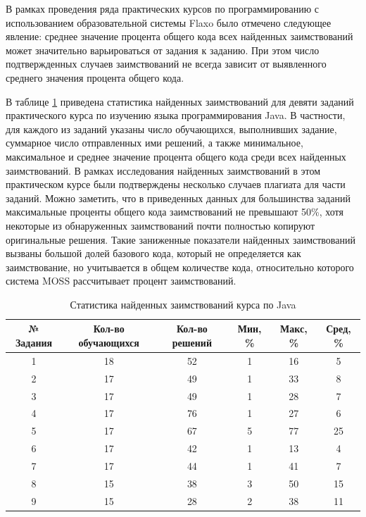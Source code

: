 \documentclass[a4paper,14pt]{extarticle}
\begin{document}
В рамках проведения ряда практических курсов по программированию с использованием образовательной системы Flaxo было отмечено следующее явление: среднее значение процента общего кода всех найденных заимствований может значительно варьироваться от задания к заданию. При этом число подтвержденных случаев заимствований не всегда зависит от выявленного среднего значения процента общего кода.

В таблице \ref{tab:javaCourseStats} приведена статистика найденных заимствований для девяти заданий практического курса по изучению языка программирования Java. В частности, для каждого из заданий указаны число обучающихся, выполнивших задание, суммарное число отправленных ими решений, а также минимальное, максимальное и среднее значение процента общего кода среди всех найденных заимствований. В рамках исследования найденных заимствований в этом практическом курсе были подтверждены несколько случаев плагиата для части заданий. Можно заметить, что в приведенных данных для большинства заданий максимальные проценты общего кода заимствований не превышают 50\%, хотя некоторые из обнаруженных заимствований почти полностью копируют оригинальные решения. Такие заниженные показатели найденных заимствований вызваны большой долей базового кода, который не определяется как заимствование, но учитывается в общем количестве кода, относительно которого система MOSS рассчитывает процент заимствований.

\begin{table}[htb]
    \centering
    \begin{tabular}{cccccc}
        \toprule
        № Задания & Кол-во обучающихся & Кол-во решений & Мин, \% & Макс, \% & Сред, \% \\
        \toprule
        1 & 18 & 52 & 1 & 16 & 5 \\
        \midrule
        2 & 17 & 49 & 1 & 33 & 8 \\
        \midrule
        3 & 17 & 49 & 1 & 28 & 7 \\
        \midrule
        4 & 17 & 76 & 1 & 27 & 6 \\
        \midrule
        5 & 17 & 67 & 5 & 77 & 25 \\
        \midrule
        6 & 17 & 42 & 1 & 13 & 4 \\
        \midrule
        7 & 17 & 44 & 1 & 41 & 7 \\
        \midrule
        8 & 15 & 38 & 3 & 50 & 15 \\
        \midrule
        9 & 15 & 28 & 2 & 38 & 11 \\
        \bottomrule
    \end{tabular}
    \caption{Статистика найденных заимствований курса по Java}
    \label{tab:javaCourseStats}
\end{table}
\end{document}
